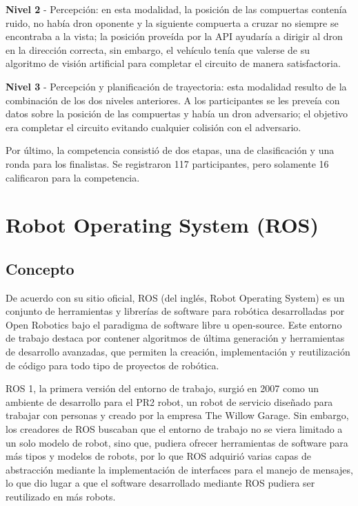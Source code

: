 \textbf{Nivel 2} - Percepción: en esta modalidad, la posición de las compuertas contenía ruido, no había dron oponente y la siguiente compuerta a cruzar no siempre se encontraba a la vista; la posición proveída por la API ayudaría a dirigir al dron en la dirección correcta, sin embargo, el vehículo tenía que valerse de su algoritmo de visión artificial para completar el circuito de manera satisfactoria.

\textbf{Nivel 3} - Percepción y planificación de trayectoria: esta modalidad resulto de la combinación de los dos niveles anteriores. A los participantes se les preveía con datos sobre la posición de las compuertas y había un dron adversario; el objetivo era completar el circuito evitando cualquier colisión con el adversario.

Por último, la competencia consistió de dos etapas, una de clasificación y una ronda para los finalistas. Se registraron 117 participantes, pero solamente 16 calificaron para la competencia.


 
\section{Robot Operating System (ROS)}

\subsection{Concepto}

De acuerdo con su sitio oficial\cite{rosFoxy}, ROS (del inglés, Robot Operating System) es un conjunto de herramientas y librerías de software para robótica desarrolladas por Open Robotics\cite{openRobotics} bajo el paradigma de software libre u open-source. Este entorno de trabajo destaca por contener algoritmos de última generación y herramientas de desarrollo avanzadas,  que permiten la creación, implementación y reutilización de código para todo tipo de proyectos de robótica.

ROS 1, la primera versión del entorno de trabajo, surgió en 2007 como un ambiente de desarrollo para el PR2 robot, un robot de servicio diseñado para trabajar con personas y creado por la empresa The Willow Garage. Sin embargo, los creadores de ROS buscaban que el entorno de trabajo no se viera limitado a un solo modelo de robot, sino que, pudiera ofrecer herramientas de software para más tipos y modelos de robots, por lo que ROS adquirió varias capas de abstracción mediante la implementación de interfaces para el manejo de mensajes, lo que dio lugar a que el software desarrollado mediante ROS pudiera ser reutilizado en más robots.   

